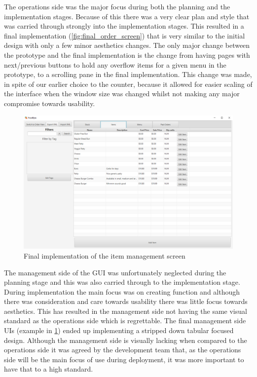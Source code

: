 The operations side was the major focus during both the planning and the implementation stages. Because of this there was a very clear plan and style that was carried through strongly into the implementation stages. This resulted in a final implementation (\ref{fig:final_order_screen}) that is very similar to the initial design with only a few minor aesthetics changes. The only major change between the prototype and the final implementation is the change from having pages with next/previous buttons to hold any overflow items for a given menu in the prototype, to a scrolling pane in the final implementation. This change was made, in spite of our earlier choice to the counter, because it allowed for easier scaling of the interface when the window size was changed whilst not making any major compromise towards usability.
\pagebreak

\begin{figure}[h]
	\centering
	\includegraphics[width=150mm]{images/Final_GUI/item_screen.png}
	\caption{Final implementation of the item management screen}
	\label{fig:final_item_screen}
\end{figure}

The management side of the GUI was unfortunately neglected during the planning stage and this was also carried through to the implementation stage. During implementation the main focus was on creating function and although there was consideration and care towards usability there was little focus towards aesthetics. This has resulted in the management side not having the same visual standard as the operations side which is regrettable. The final management side UIs (example in \ref{fig:final_item_screen}) ended up implementing a stripped down tabular focused design. Although the management side is visually lacking when compared to the operations side it was agreed by the development team that, as the operations side will be the main focus of use during deployment, it was more important to have that to a high standard.

